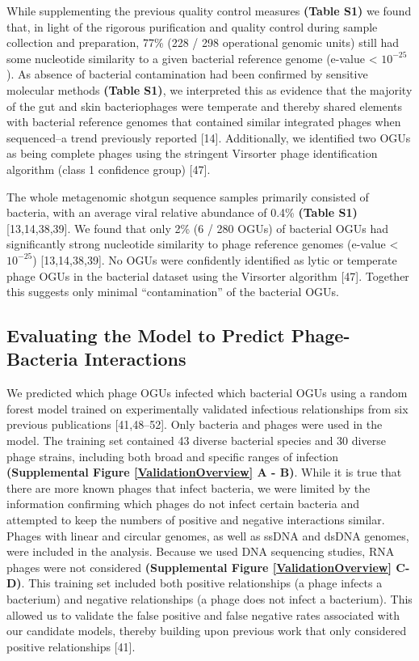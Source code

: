 \documentclass[12pt,]{article}
\begin{document}
While supplementing the previous quality control measures \textbf{(Table
S1)} we found that, in light of the rigorous purification and quality
control during sample collection and preparation, 77\% (228 / 298
operational genomic units) still had some nucleotide similarity to a
given bacterial reference genome (e-value \textless{} \(10^{-25}\)). As
absence of bacterial contamination had been confirmed by sensitive
molecular methods \textbf{(Table S1)}, we interpreted this as evidence
that the majority of the gut and skin bacteriophages were temperate and
thereby shared elements with bacterial reference genomes that contained
similar integrated phages when sequenced--a trend previously reported
{[}14{]}. Additionally, we identified two OGUs as being complete phages
using the stringent Virsorter phage identification algorithm (class 1
confidence group) {[}47{]}.

The whole metagenomic shotgun sequence samples primarily consisted of
bacteria, with an average viral relative abundance of 0.4\%
\textbf{(Table S1)} {[}13,14,38,39{]}. We found that only 2\% (6 / 280
OGUs) of bacterial OGUs had significantly strong nucleotide similarity
to phage reference genomes (e-value \textless{} \(10^{-25}\))
{[}13,14,38,39{]}. No OGUs were confidently identified as lytic or
temperate phage OGUs in the bacterial dataset using the Virsorter
algorithm {[}47{]}. Together this suggests only minimal
``contamination'' of the bacterial OGUs.

\subsection{Evaluating the Model to Predict Phage-Bacteria
Interactions}\label{evaluating-the-model-to-predict-phage-bacteria-interactions}

We predicted which phage OGUs infected which bacterial OGUs using a
random forest model trained on experimentally validated infectious
relationships from six previous publications {[}41,48--52{]}. Only
bacteria and phages were used in the model. The training set contained
43 diverse bacterial species and 30 diverse phage strains, including
both broad and specific ranges of infection \textbf{(Supplemental Figure
\ref{ValidationOverview} A - B)}. While it is true that there are more
known phages that infect bacteria, we were limited by the information
confirming which phages do not infect certain bacteria and attempted to
keep the numbers of positive and negative interactions similar. Phages
with linear and circular genomes, as well as ssDNA and dsDNA genomes,
were included in the analysis. Because we used DNA sequencing studies,
RNA phages were not considered \textbf{(Supplemental Figure
\ref{ValidationOverview} C-D)}. This training set included both positive
relationships (a phage infects a bacterium) and negative relationships
(a phage does not infect a bacterium). This allowed us to validate the
false positive and false negative rates associated with our candidate
models, thereby building upon previous work that only considered
positive relationships {[}41{]}.
\end{document}
